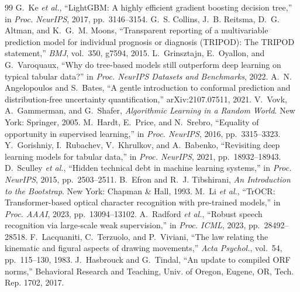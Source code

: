 \documentclass[conference]{IEEEtran}
\begin{document}
\begin{thebibliography}{99}
 G.~Ke \emph{et al.}, ``LightGBM: A highly efficient gradient boosting decision tree,'' in \emph{Proc. NeurIPS}, 2017, pp.~3146--3154.
 G.~S. Collins, J.~B. Reitsma, D.~G. Altman, and K.~G.~M. Moons, ``Transparent reporting of a multivariable prediction model for individual prognosis or diagnosis (TRIPOD): The TRIPOD statement,'' \emph{BMJ}, vol.~350, g7594, 2015.
 L.~Grinsztajn, E.~Oyallon, and G.~Varoquaux, ``Why do tree-based models still outperform deep learning on typical tabular data?'' in \emph{Proc. NeurIPS Datasets and Benchmarks}, 2022.
 A.~N. Angelopoulos and S.~Bates, ``A gentle introduction to conformal prediction and distribution-free uncertainty quantification,'' arXiv:2107.07511, 2021.
 V.~Vovk, A.~Gammerman, and G.~Shafer, \emph{Algorithmic Learning in a Random World}. New York: Springer, 2005.
 M.~Hardt, E.~Price, and N.~Srebro, ``Equality of opportunity in supervised learning,'' in \emph{Proc. NeurIPS}, 2016, pp.~3315--3323.
 Y.~Gorishniy, I.~Rubachev, V.~Khrulkov, and A.~Babenko, ``Revisiting deep learning models for tabular data,'' in \emph{Proc. NeurIPS}, 2021, pp.~18932--18943.
 D.~Sculley \emph{et al.}, ``Hidden technical debt in machine learning systems,'' in \emph{Proc. NeurIPS}, 2015, pp.~2503--2511.
 B.~Efron and R.~J. Tibshirani, \emph{An Introduction to the Bootstrap}. New York: Chapman \& Hall, 1993.
 M.~Li \emph{et al.}, ``TrOCR: Transformer-based optical character recognition with pre-trained models,'' in \emph{Proc. AAAI}, 2023, pp.~13094--13102.
 A.~Radford \emph{et al.}, ``Robust speech recognition via large-scale weak supervision,'' in \emph{Proc. ICML}, 2023, pp.~28492--28518.
 F.~Lacquaniti, C.~Terzuolo, and P.~Viviani, ``The law relating the kinematic and figural aspects of drawing movements,'' \emph{Acta Psychol.}, vol.~54, pp.~115--130, 1983.
 J.~Hasbrouck and G.~Tindal, ``An update to compiled ORF norms,'' Behavioral Research and Teaching, Univ. of Oregon, Eugene, OR, Tech. Rep. 1702, 2017.
\end{thebibliography}
\end{document}
